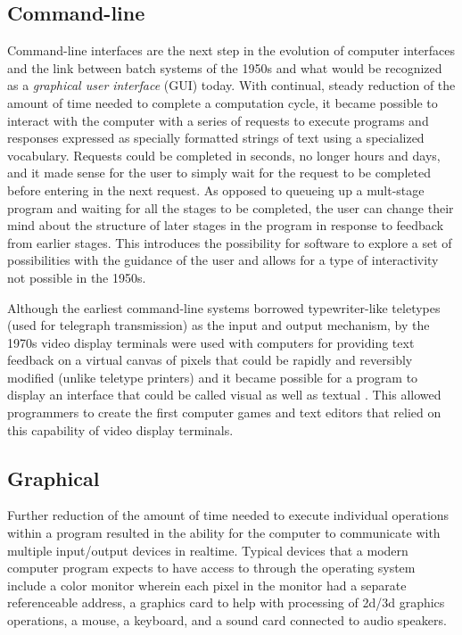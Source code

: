 \subsection{Command-line}

Command-line interfaces are the next step in the evolution of computer interfaces and the link between batch systems of the 1950s and what would be recognized as a \emph{graphical user interface} (GUI) today. With continual, steady reduction of the amount of time needed to complete a computation cycle, it became possible to interact with the computer with a series of requests to execute programs and responses expressed as specially formatted strings of text using a specialized vocabulary. Requests could be completed in seconds, no longer hours and days, and it made sense for the user to simply wait for the request to be completed before entering in the next request. As opposed to queueing up a mult-stage program and waiting for all the stages to be completed, the user can change their mind about the structure of later stages in the program in response to feedback from earlier stages. This introduces the possibility for software to explore a set of possibilities with the guidance of the user and allows for a type of interactivity not possible in the 1950s. 

Although the earliest command-line systems borrowed typewriter-like teletypes (used for telegraph transmission) as the input and output mechanism, by the 1970s video display terminals were used with computers for providing text feedback on a virtual canvas of pixels that could be rapidly and reversibly modified (unlike teletype printers) and it became possible for a program to display an interface that could be called visual as well as textual \cite{unix2008}. This allowed programmers to create the first computer games and text editors that relied on this capability of video display terminals.

\subsection{Graphical}

Further reduction of the amount of time needed to execute individual operations within a program resulted in the ability for the computer to communicate with multiple input/output devices in realtime. Typical devices that a modern computer program expects to have access to through the operating system include a color monitor wherein each pixel in the monitor had a separate referenceable address, a graphics card to help with processing of 2d/3d graphics operations, a mouse, a keyboard, and a sound card connected to audio speakers.

